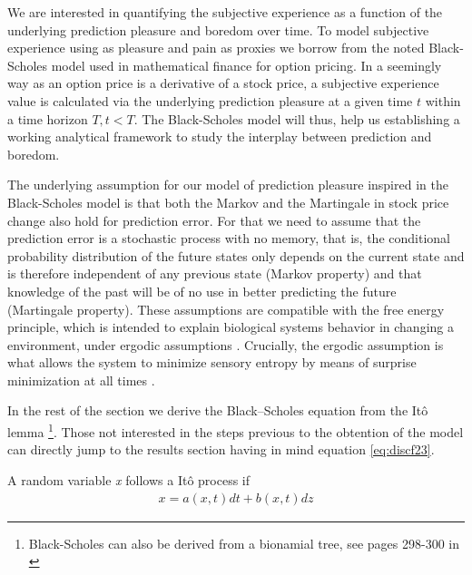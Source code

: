 \documentclass[11pt,twocolumn]{article}
\begin{document}
We are interested in quantifying the subjective experience as a function of the underlying prediction pleasure and boredom over time. To model subjective experience using as pleasure and pain as proxies we borrow from the noted Black-Scholes model \citep{black_pricing_1973} used in mathematical finance for option pricing. In a seemingly way as an option price is a derivative of a stock price, a subjective experience value is calculated via the underlying prediction pleasure at a given time $t$ within a time horizon $T, t < T$. The Black-Scholes model will thus, help us  establishing a working analytical framework to study the interplay between prediction and boredom.
 
The underlying assumption for our model of prediction pleasure inspired in the Black-Scholes model is that both the Markov and the Martingale in stock price change also hold for prediction error. For that we need to assume that the prediction error is a stochastic process with no memory, that is, the conditional probability distribution of the future states only depends on the current state and is therefore independent of any previous state (Markov property) and that knowledge of the past will be of no use in better predicting the future (Martingale property). These assumptions are compatible with the free energy principle, which is intended to explain biological systems behavior in changing a environment, under ergodic assumptions \citep{birkhoff_proof_1931}. Crucially, the ergodic assumption is what allows the system to minimize sensory entropy by means of surprise minimization at all times \citep{friston_action_2010}. 

In the rest of the section we derive the Black–Scholes equation from the It\^{o} lemma \citep{ito_stochastic_1951} \footnote{Black-Scholes can  also be derived from a bionamial tree, see pages 298-300 in \citep{hull_options_2011}}. Those not interested in the steps previous to the obtention of the model can directly jump to  the results section having in mind equation \ref{eq:discf23}.

A random variable \emph{x} follows a It\^{o} process if 
\begin{equation*}
\begin{split}
   x = a(x,t)dt + b(x,t)dz
\end{split}
\label{eq:itopr}
\end{equation*}
\end{document}
